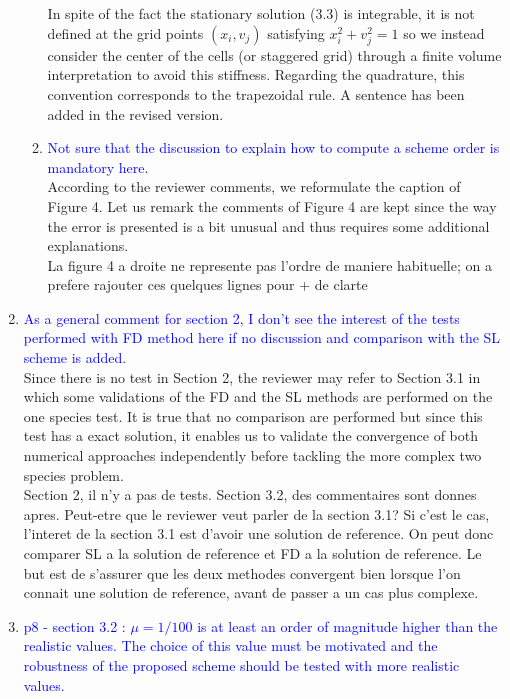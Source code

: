 \documentclass{article}
\begin{document}
\begin{enumerate}
\begin{enumerate}
In spite of the fact the stationary solution (3.3) is integrable, it is not defined at the grid points $(x_i, v_j)$ satisfying $x_i^2+v_j^2=1$ 
so we instead consider the center of the cells (or staggered grid) through a finite volume interpretation to avoid this stiffness. 
Regarding the quadrature, this convention corresponds to the trapezoidal rule.  A sentence has been added in the revised version. \\
\item  \textcolor{blue}{Not sure that the discussion to explain how to compute a scheme order is mandatory here.}\\
According to the reviewer comments, we reformulate the caption of Figure 4. Let us remark the comments of Figure 4 
are kept since the way the error is presented is a bit unusual and thus requires some additional explanations. \\ 
{\small La figure 4 a droite ne represente pas l'ordre de maniere habituelle; on a prefere rajouter ces quelques lignes pour + de clarte}
\end{enumerate}
    \item \textcolor{blue}{As a general comment for section 2, I don't see the interest of the tests performed with FD method here if no discussion and comparison with the SL scheme is added. }\\ 
    Since there is no test in Section 2, the reviewer may refer to Section 3.1 in which some validations of the FD and the SL methods 
    are performed on the one species test. It is true that no comparison are performed  but since this test has a exact solution, 
    it enables us to validate the convergence of both numerical approaches independently before tackling the more complex two species problem. \\
    {\small Section 2, il n'y a pas de tests.
Section 3.2, des commentaires sont donnes apres. Peut-etre que le reviewer veut parler de la section 3.1?
Si c'est le cas, l'interet de la section 3.1 est d'avoir une solution de reference. On peut donc comparer SL a la solution de reference et FD a la solution de reference.
Le but est de s'assurer que les deux methodes convergent bien lorsque l'on connait une solution de reference, avant de passer a un cas plus complexe.}
    \item \textcolor{blue}{p8 - section 3.2 : $\mu = 1/100$ is at least an order of magnitude higher than the realistic values. The choice of this value must be motivated and the robustness of the proposed scheme should be tested with more realistic values.} \\

\end{enumerate}
\end{document}
